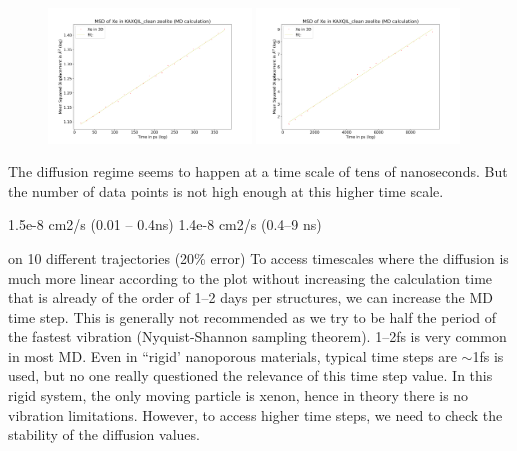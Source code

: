 \documentclass[main]{subfiles}
\begin{document}
\begin{figure}[ht]
  \centering
\includegraphics[width=0.48\textwidth]{figures/5-diffusion/MSD_Xe_coeff_KAXQIL_clean_1.pdf}
\includegraphics[width=0.48\textwidth]{figures/5-diffusion/MSD_Xe_coeff_KAXQIL_clean_2.pdf}
\caption{}\label{fgr:MSD_linear_init}
\end{figure}

The diffusion regime seems to happen at a time scale of tens of nanoseconds. But the number of data points is not high enough at this higher time scale. 

1.5e-8 cm2/s (0.01 -- 0.4ns)
1.4e-8 cm2/s (0.4--9 ns)


 on 10 different trajectories (20\% error)
To access timescales where the diffusion is much more linear according to the plot without increasing the calculation time that is already of the order of 1--2 days per structures, we can increase the MD time step. This is generally not recommended as we try to be half the period of the fastest vibration (Nyquist-Shannon sampling theorem).
1--2fs is very common in most MD. Even in ``rigid' nanoporous materials, typical time steps are $\sim$1fs is used, but no one really questioned the relevance of this time step value.\autocite{Bukowski_2021}  In this rigid system, the only moving particle is xenon, hence in theory there is no vibration limitations. However, to access higher time steps, we need to check the stability of the diffusion values.
\end{document}
